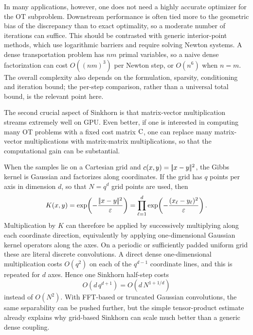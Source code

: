 In many applications, however, one does not need a highly accurate optimizer for the OT subproblem. Downstream performance is often tied more to the geometric bias of the discrepancy than to exact optimality, so a moderate number of iterations can suffice.
%
This should be contrasted with generic interior-point methods, which use logarithmic barriers and require solving Newton systems. A dense transportation problem has $nm$ primal variables, so a naive dense factorization can cost $O((nm)^3)$ per Newton step, or $O(n^6)$ when $n=m$. The overall complexity also depends on the formulation, sparsity, conditioning and iteration bound; the per-step comparison, rather than a universal total bound, is the relevant point here.

The second crucial aspect of Sinkhorn is that matrix-vector multiplication streams extremely well on GPU\@. Even better, if one is interested in computing many OT problems with a fixed cost matrix $\mathrm{C}$, one can replace many matrix-vector multiplications with matrix-matrix multiplications, so that the computational gain can be substantial.

\begin{rem}\label{rem-sinkhorn-separable-gaussian}
	When the samples lie on a Cartesian grid and $c(x,y)=|\!| x-y |\!|^2$, the Gibbs kernel is Gaussian and factorizes along coordinates. If the grid has $q$ points per axis in dimension $d$, so that $N=q^d$ grid points are used, then
	\[
		K(x,y)=\exp\!\left(-\frac{|\!| x-y |\!|^2}{\varepsilon}\right)
		=
		\prod_{\ell=1}^d
		\exp\!\left(-\frac{(x_\ell-y_\ell)^2}{\varepsilon}\right).
	\]
	Multiplication by $K$ can therefore be applied by successively multiplying along each coordinate direction, equivalently by applying one-dimensional Gaussian kernel operators along the axes. On a periodic or sufficiently padded uniform grid these are literal discrete convolutions. A direct dense one-dimensional multiplication costs $O(q^2)$ on each of the $q^{d-1}$ coordinate lines, and this is repeated for $d$ axes. Hence one Sinkhorn half-step costs
	\begin{equation}\label{eq-separable-gaussian-half-step}
		O(d\,q^{d+1})=O(d\,N^{1+1/d})
	\end{equation}
	instead of $O(N^2)$. With FFT-based or truncated Gaussian convolutions, the same separability can be pushed further, but the simple tensor-product estimate already explains why grid-based Sinkhorn can scale much better than a generic dense coupling.
\end{rem}



